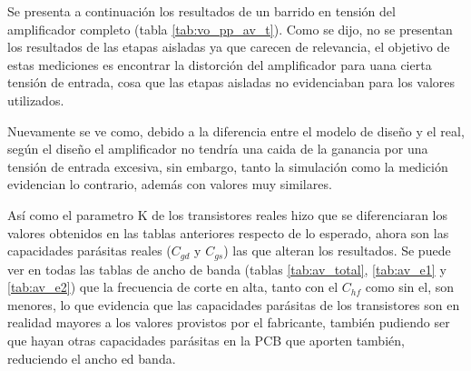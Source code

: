 Se presenta a continuación los resultados de un barrido en tensión del amplificador completo (tabla \ref{tab:vo_pp_av_t}). Como se dijo, no se presentan los resultados de las etapas aisladas ya que carecen de relevancia, el objetivo de estas mediciones es encontrar la distorción del amplificador para uana cierta tensión de entrada, cosa que las etapas aisladas no evidenciaban para los valores utilizados.

Nuevamente se ve como, debido a la diferencia entre el modelo de diseño y el real, según el diseño el amplificador no tendría una caida de la ganancia por una tensión de entrada excesiva, sin embargo, tanto la simulación como la medición evidencian lo contrario, además con valores muy similares.

\begin{table}[H]
\centering
{}
\caption{Tensión de salida pico a pico ($V_{o\text{ pp}}$ T) y Ganancia total ($A_v$ T) a $f = 5\,\text{kHz}$}
\label{tab:vo_pp_av_t}
\end{table}

Así como el parametro K de los transistores reales hizo que se diferenciaran los valores obtenidos en las tablas anteriores respecto de lo esperado, ahora son las capacidades parásitas reales ($C_{gd}$ y $C_{gs}$) las que alteran los resultados. Se puede ver en todas las tablas de ancho de banda (tablas \ref{tab:av_total}, \ref{tab:av_e1} y \ref{tab:av_e2}) que la frecuencia de corte en alta, tanto con el $C_{hf}$ como sin el, son menores, lo que evidencia que las capacidades parásitas de los transistores son en realidad mayores a los valores provistos por el fabricante, también pudiendo ser que hayan otras capacidades parásitas en la PCB que aporten también, reduciendo el ancho ed banda.

